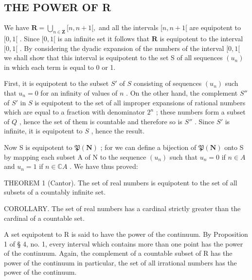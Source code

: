 \subsection{THE POWER OF R}

We have \(\mathbf{R} = \bigcup_{n\in \mathbf{Z}}[n,n + 1[,\) and all the intervals \([n,n + 1[\) are equipotent to \([0,1[\) . Since \([0,1[\) is an infinite set it follows that \(\mathbf{R}\) is equipotent to the interval \([0,1[\) . By considering the dyadic expansion of the numbers of the interval \([0,1[\) we shall show that this interval is equipotent to the set S of all sequences \((u_n)\) in which each term is equal to 0 or 1.

First, it is equipotent to the subset \(S'\) of \(S\) consisting of sequences \((u_n)\) such that \(u_n = 0\) for an infinity of values of \(n\) . On the other hand, the complement \(S''\) of \(S'\) in \(S\) is equipotent to the set of all improper expansions of rational numbers which are equal to a fraction with denominator \(2^n\) ; these numbers form a subset of \(Q\) , hence the set of them is countable and therefore so is \(S''\) . Since \(S'\) is infinite, it is equipotent to \(S\) , hence the result.

Now S is equipotent to \(\mathfrak{P}(\mathbf{N})\) ; for we can define a bijection of \(\mathfrak{P}(\mathbf{N})\) onto S by mapping each subset A of N to the sequence \((u_n)\) such that \(u_n = 0\) if \(n \in A\) and \(u_n = 1\) if \(n \in \mathbb{C}A\) . We have thus proved:

THEOREM 1 (Cantor). The set of real numbers is equipotent to the set of all subsets of a countably infinite set.

COROLLARY. The set of real numbers has a cardinal strictly greater than the cardinal of a countable set.

A set equipotent to R is said to have the power of the continuum. By Proposition 1 of § 4, no. 1, every interval which contains more than one point has the power of the continuum. Again, the complement of a countable subset of R has the power of the continuum in particular, the set of all irrational numbers has the power of the continuum.

